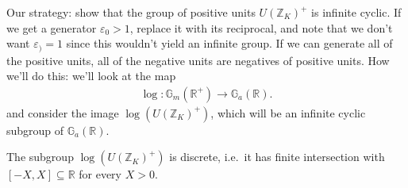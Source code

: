 \begin{remark}

Our strategy: show that the group of positive units
\(U({\mathbb{Z}}_K)^+\) is infinite cyclic. If we get a generator
\(\varepsilon_0 > 1\), replace it with its reciprocal, and note that we
don't want \(\varepsilon_) = 1\) since this wouldn't yield an infinite
group. If we can generate all of the positive units, all of the negative
units are negatives of positive units. How we'll do this: we'll look at
the map
\begin{align*}
\log: {\mathbb{G}}_m({\mathbb{R}}^+) \xrightarrow{} {\mathbb{G}}_a({\mathbb{R}})
.\end{align*}
and consider the image \(\log( U( {\mathbb{Z}}_K)^+)\), which will be an
infinite cyclic subgroup of \({\mathbb{G}}_a({\mathbb{R}})\).

\end{remark}

\begin{proposition}

The subgroup \(\log( U ({\mathbb{Z}}_K)^+ )\) is discrete, i.e.~it has
finite intersection with \([-X, X] \subseteq {\mathbb{R}}\) for every
\(X>0\).

\end{proposition}

